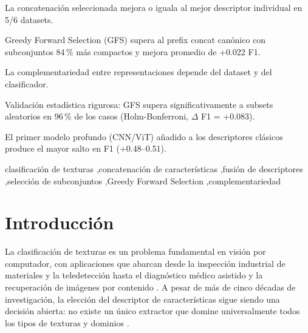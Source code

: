 \documentclass[a4paper,fleqn]{cas-sc}
\begin{document}
\begin{highlights}
\item La concatenaci\'on seleccionada mejora o iguala al mejor descriptor individual en 5/6 datasets.
\item Greedy Forward Selection (GFS) supera al prefix concat can\'onico con subconjuntos 84\,\% m\'as compactos y mejora promedio de +0.022 F1.
\item La complementariedad entre representaciones depende del dataset y del clasificador.
\item Validaci\'on estad\'istica rigurosa: GFS supera significativamente a subsets aleatorios en 96\,\% de los casos (Holm-Bonferroni, $\Delta$ F1 = +0.083).
\item El primer modelo profundo (CNN/ViT) a\~nadido a los descriptores cl\'asicos produce el mayor salto en F1 (+0.48--0.51).
\end{highlights}

\begin{keywords}
clasificaci\'on de texturas \sep concatenaci\'on de caracter\'isticas \sep fusi\'on de descriptores \sep selecci\'on de subconjuntos \sep Greedy Forward Selection \sep complementariedad
\end{keywords}

\maketitle

\section{Introducci\'on}\label{sec:intro}

La clasificaci\'on de texturas es un problema fundamental en visi\'on por computador, con aplicaciones que abarcan desde la inspecci\'on industrial de materiales y la teledetecci\'on hasta el diagn\'ostico m\'edico asistido y la recuperaci\'on de im\'agenes por contenido \citep{bel2022texture}. A pesar de m\'as de cinco d\'ecadas de investigaci\'on, la elecci\'on del descriptor de caracter\'isticas sigue siendo una decisi\'on abierta: no existe un \'unico extractor que domine universalmente todos los tipos de texturas y dominios \citep{cimpoi2016fisher}.
\end{document}
